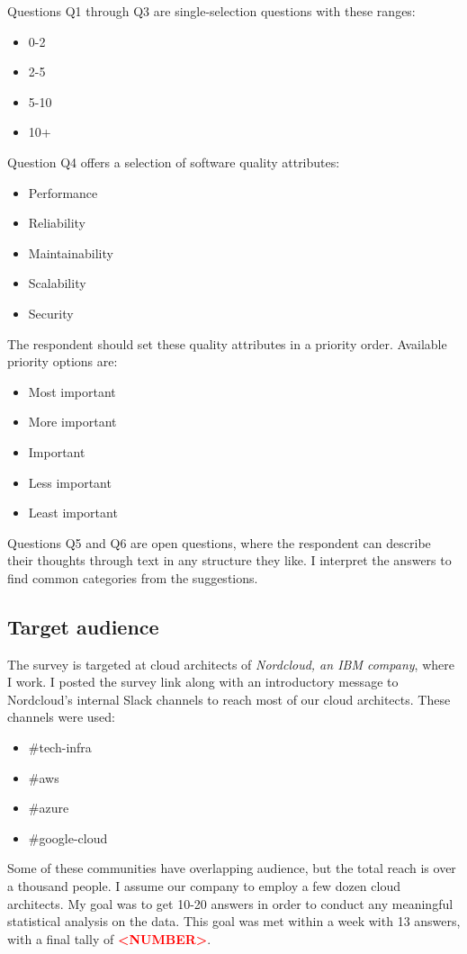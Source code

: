 \documentclass[utf8,english]{gradu3}
\newcommand{\todo}[1]{\textbf{\textcolor{red}{#1}}}
\begin{document}
Questions Q1 through Q3 are single-selection questions with these ranges:
\begin{itemize}
  \item 0-2
  \item 2-5
  \item 5-10
  \item 10+
\end{itemize}

Question Q4 offers a selection of software quality attributes:
\begin{itemize}
  \item Performance
  \item Reliability
  \item Maintainability
  \item Scalability
  \item Security
\end{itemize}

The respondent should set these quality attributes in a priority order.
Available priority options are:
\begin{itemize}
  \item Most important
  \item More important
  \item Important
  \item Less important
  \item Least important
\end{itemize}

Questions Q5 and Q6 are open questions, where the respondent can describe their
thoughts through text in any structure they like.
I interpret the answers to find common categories from the suggestions.

\subsection{Target audience}
The survey is targeted at cloud architects of \textit{Nordcloud, an IBM company}, where I work.
I posted the survey link along with an introductory message to Nordcloud's
internal Slack channels to reach most of our cloud architects.
These channels were used:
\begin{itemize}
  \item \#tech-infra
  \item \#aws
  \item \#azure
  \item \#google-cloud
\end{itemize}

Some of these communities have overlapping audience, but the total reach is over a thousand people.
I assume our company to employ a few dozen cloud architects.
My goal was to get 10-20 answers in order to conduct any meaningful statistical analysis on
the data.
This goal was met within a week with 13 answers, with a final tally of \todo{<NUMBER>}.
\end{document}
